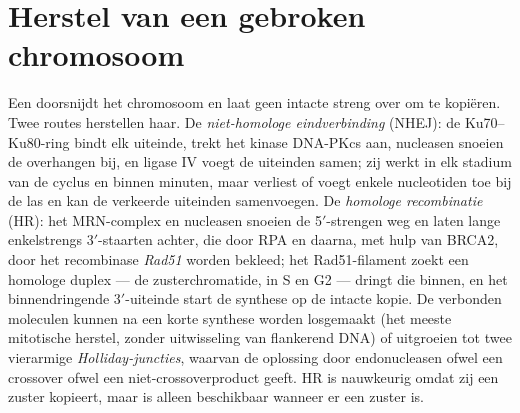 \section{Herstel van een gebroken chromosoom}

\begin{definition}\label{def:b3:dna-repair:dsb}
Een \emph{} doorsnijdt het chromosoom en laat geen
intacte streng over om te kopiëren. Twee routes herstellen haar. De
\emph{niet-homologe eindverbinding} (NHEJ): de Ku70--Ku80-ring bindt
elk uiteinde, trekt het kinase DNA-PKcs aan, nucleasen snoeien de
overhangen bij, en ligase IV voegt de uiteinden samen; zij werkt in elk
stadium van de cyclus en binnen minuten, maar verliest of voegt enkele
nucleotiden toe bij de las en kan de verkeerde uiteinden samenvoegen.
De \emph{homologe recombinatie} (HR): het MRN-complex en nucleasen
snoeien de 5$'$-strengen weg en laten lange enkelstrengs
3$'$-staarten achter, die door RPA en daarna, met hulp van BRCA2, door
het recombinase \emph{Rad51} worden bekleed; het Rad51-filament zoekt
een homologe duplex --- de zusterchromatide, in S en G2 --- dringt die
binnen, en het binnendringende 3$'$-uiteinde start de synthese op de
intacte kopie. De verbonden moleculen kunnen na een korte synthese
worden losgemaakt (het meeste mitotische herstel, zonder uitwisseling
van flankerend DNA) of uitgroeien tot twee vierarmige
\emph{Holliday-juncties}, waarvan de oplossing door endonucleasen
ofwel een crossover ofwel een niet-crossoverproduct geeft. HR is
nauwkeurig omdat zij een zuster kopieert, maar is alleen beschikbaar
wanneer er een zuster is.
\end{definition}

